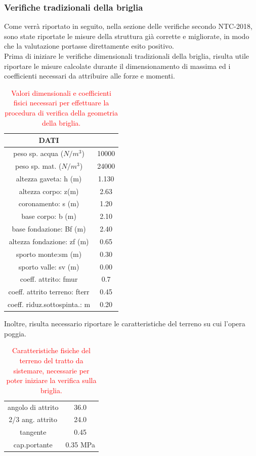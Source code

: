 \subsubsection{Verifiche tradizionali della briglia}
Come verrà riportato in seguito, nella sezione delle verifiche secondo NTC-2018, sono state riportate le misure della struttura già corrette e migliorate, in modo che la valutazione portasse direttamente esito positivo.\\
Prima di iniziare le verifiche dimensionali tradizionali della briglia, risulta utile riportare le misure calcolate durante il dimensionamento di massima ed i coefficienti necessari da attribuire alle forze e momenti.
\begin{table}[H] \centering
    \caption{\textcolor{red}{Valori dimensionali e coefficienti fisici necessari per effettuare la procedura di verifica della geometria della briglia.}}
    \begin{tabular}{cc}
    \toprule
    DATI                          &       \\
    \midrule
    peso sp. acqua ($N/m^3$)         & 10000 \\
    peso sp. mat. ($N/m^3$)          & 24000 \\
    altezza gaveta: h (m)         & 1.130 \\
    altezza corpo: z(m)           & 2.63  \\
    coronamento: s (m)            & 1.20  \\
    base corpo: b (m)              & 2.10  \\
    base fondazione: Bf (m)       & 2.40  \\
    altezza fondazione: zf (m)    & 0.65  \\
    sporto monte:sm (m)            & 0.30  \\
    sporto valle: sv (m)           & 0.00  \\
    coeff. attrito: fmur           & 0.7   \\
    coeff. attrito terreno: fterr & 0.45  \\
    coeff. riduz.sottospinta.: m  & 0.20  \\
    \bottomrule
    \end{tabular}
\end{table}
Inoltre, risulta necessario riportare le caratteristiche del terreno su cui l'opera poggia.
\begin{table}[H] \centering
    \caption{\textcolor{red}{Caratteristiche fisiche del terreno del tratto da sistemare, necessarie per poter iniziare la verifica sulla briglia.}}
    \begin{tabular}{cc}
    \toprule
    angolo di attrito & 36.0      \\
    2/3 ang. attrito  & 24.0      \\
    tangente          & 0.45      \\
    cap.portante      & 0.35 MPa \\
    \bottomrule
    \end{tabular}
    \end{table}


